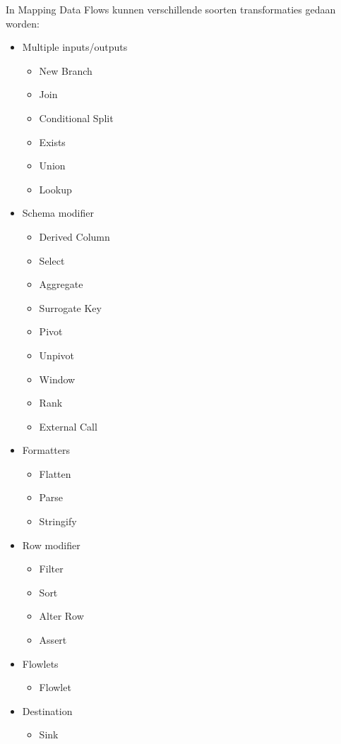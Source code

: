 In Mapping Data Flows kunnen verschillende soorten transformaties gedaan worden:

\begin{itemize}
    \item Multiple inputs/outputs
    \begin{itemize}
        \item New Branch
        \item Join
        \item Conditional Split
        \item Exists
        \item Union
        \item Lookup
    \end{itemize}
    \item Schema modifier
    \begin{itemize}
        \item Derived Column
        \item Select
        \item Aggregate
        \item Surrogate Key
        \item Pivot
        \item Unpivot
        \item Window
        \item Rank
        \item External Call
    \end{itemize}
    \item Formatters
    \begin{itemize}
        \item Flatten
        \item Parse
        \item Stringify
    \end{itemize}
    \item Row modifier
    \begin{itemize}
        \item Filter
        \item Sort
        \item Alter Row
        \item Assert
    \end{itemize}
    \item Flowlets
    \begin{itemize}
        \item Flowlet
    \end{itemize}
    \item Destination
    \begin{itemize}
        \item Sink
    \end{itemize}
\end{itemize}

